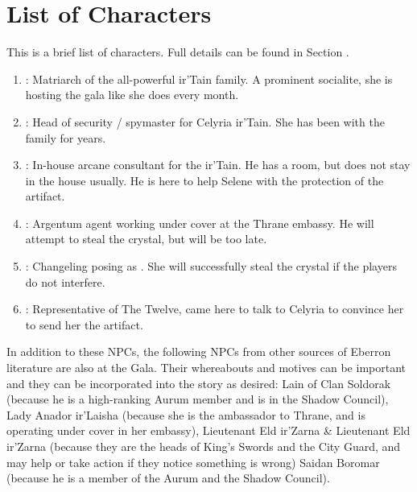\documentclass[twocolumn]{dndbook}
\begin{document}
\section{List of Characters}

This is a brief list of characters. Full details can be found in Section .

\begin{enumerate}
    \item {}: Matriarch of the all-powerful ir'Tain family. A prominent socialite, she is hosting the gala like she does every month.
    \item {}: Head of security / spymaster for Celyria ir'Tain. She has been with the family for years.
    \item {}: In-house arcane consultant for the ir'Tain. He has a room, but does not stay in the house usually. He is here to help Selene with the protection of the artifact.
    \item {}: Argentum agent working under cover at the Thrane embassy. He will attempt to steal the crystal, but will be too late.
    \item {}: Changeling posing as . She will successfully steal the crystal if the players do not interfere.
    \item {}: Representative of The Twelve, came here to talk to Celyria to convince her to send her the artifact.
\end{enumerate}

In addition to these NPCs, the following NPCs from other sources of Eberron literature are also at the Gala.
Their whereabouts and motives can be important and they can be incorporated into the story as desired:
Lain of Clan Soldorak (because he is a high-ranking Aurum member and is in the Shadow Council),
Lady Anador ir'Laisha (because she is the ambassador to Thrane, and  is operating under cover in her embassy),
Lieutenant Eld ir'Zarna \& Lieutenant Eld ir'Zarna (because they are the heads of King's Swords and the City Guard, and may help or take action if they notice something is wrong)
Saidan Boromar (because he is a member of the Aurum and the Shadow Council).\par

\end{document}
